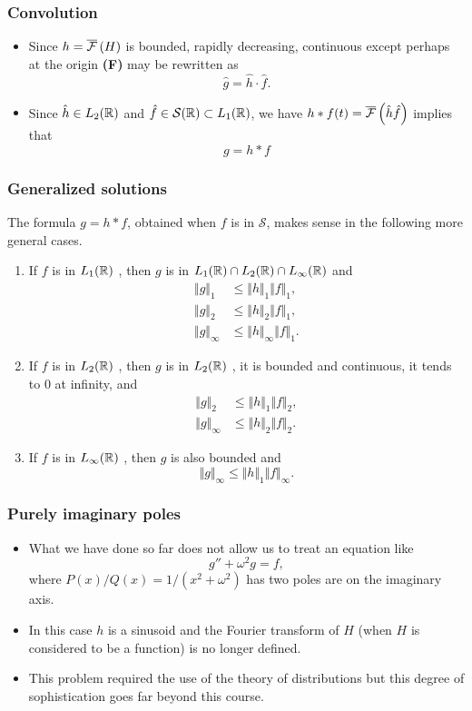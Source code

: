 \begin{frame}
\frametitle{Convolution}
\begin{itemize}
\item Since $h=\overline{\mathcal{F}}\left( H \right)$ is bounded, rapidly decreasing, continuous except perhaps at the origin
\alert{\textbf{(F)}} may be rewritten as
$$
\hat{g}=\hat{h}\cdot\hat{f}.
$$
\item Since $\hat{h} \in L_2(\mathbb{R})$ and $\hat{f} \in \mathcal{S}(\mathbb{R}) \subset L_1(\mathbb{R})$,
we have $h * f(t)= \overline{\mathcal{F}}\left( \hat{h} \hat{f} \right)$ implies that
$$
g=h*f
$$
\end{itemize}
\end{frame}

\begin{frame}
\frametitle{Generalized solutions}
The formula $g=h*f$, obtained when $f$ is in $\mathcal{S}$, makes sense in the following more general cases.
\begin{enumerate}[label=(\roman*)]
\item If $f$ is in $L_1(\mathbb{R})$ , then $g$ is in $L_1(\mathbb{R})\cap L_2(\mathbb{R})\cap L_\infty(\mathbb{R})$  and
\begin{align*}
\Vert g\Vert_{1}\ &\leq\Vert h\Vert_{1}\Vert f\Vert_{1}, \\
\Vert g\Vert_{2}\ &\leq\Vert h\Vert_{2}\Vert f\Vert_{1}, \\
\Vert g\Vert_{\infty} &\leq\Vert h\Vert_{\infty}\Vert f\Vert_{1}.
\end{align*}
\item If $f$ is in $L_2(\mathbb{R})$ , then $g$ is in $L_2(\mathbb{R})$ , it is bounded and continuous, it tends to $0$ at infinity, and
\begin{align*}
\Vert g\Vert_{2}\ &\leq\Vert h\Vert_{1}\Vert f\Vert_{2}, \\
\Vert g\Vert_{\infty}& \leq \Vert h\Vert_{2}\Vert f\Vert_{2}.
\end{align*}
\item If $f$ is in $L_\infty(\mathbb{R})$ , then $g$ is also bounded and
$$
\Vert g\Vert_{\infty}\leq\Vert h\Vert_{1}\Vert f\Vert_{\infty}.
$$
\end{enumerate}
\end{frame}


\begin{frame}
\frametitle{Purely imaginary poles}
\begin{itemize}
\item What we have done so far does not allow us to treat an equation like
$$
g''+\omega^{2}g=f,
$$
where $P(x)/Q(x)=1/(x^{2}+\omega^{2})$ has two poles are on the imaginary axis.
\item In this case $h$ is a sinusoid and the Fourier transform of $H$ (when $H$ is considered to be a function) is no longer defined.
\item This problem required the use of the \alert{theory of  distributions} but this degree of sophistication goes far beyond this course.
\end{itemize}
\end{frame}

